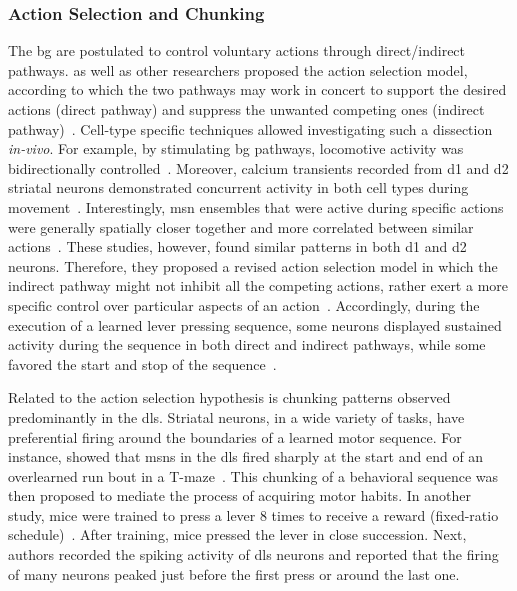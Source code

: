 \subsubsection{Action Selection and Chunking}
The \gls{bg} are postulated to control voluntary actions through direct/indirect pathways.
 as well as other researchers proposed the action selection model, according to which the two pathways may work in concert to support the desired actions (direct pathway) and suppress the unwanted competing ones (indirect pathway)~\cite{Mink1996}.
Cell-type specific techniques allowed investigating such a dissection \textit{in-vivo}.
For example, by stimulating \gls{bg} pathways, locomotive activity was bidirectionally controlled~\cite{Kravitz2010Nature}.
Moreover, calcium transients recorded from \gls{d1} and \gls{d2} striatal neurons demonstrated concurrent activity in both cell types during movement~\cite{Cui2013Nature,Barbera2016Neuron}.
Interestingly, \gls{msn} ensembles that were active during specific actions were generally spatially closer together and more correlated between similar actions~\cite{Klaus2017Neuron}.
These studies, however, found similar patterns in both \gls{d1} and \gls{d2} neurons.
Therefore, they proposed a revised action selection model in which the indirect pathway might not inhibit all the competing actions, rather exert a more specific control over particular aspects of an action~\cite{Klaus2017Neuron}.
Accordingly, during the execution of a learned lever pressing sequence, some neurons displayed sustained activity during the sequence in both direct and indirect pathways, while some favored the start and stop of the sequence~\cite{Jin2014NN}.
\par
Related to the action selection hypothesis is chunking patterns observed predominantly in the \gls{dls}.
Striatal neurons, in a wide variety of tasks, have preferential firing around the boundaries of a learned motor sequence.
For instance,  showed that \glspl{msn} in the \gls{dls} fired sharply at the start and end of an overlearned run bout in a T-maze~\cite{Barnes2005Nature}.
This chunking of a behavioral sequence was then proposed to mediate the process of acquiring motor habits.
In another study, mice were trained to press a lever 8 times to receive a reward (fixed-ratio schedule)~\cite{Jin2010N}.
After training, mice pressed the lever in close succession.
Next, authors recorded the spiking activity of \gls{dls} neurons and reported that the firing of many neurons peaked just before the first press or around the last one.
